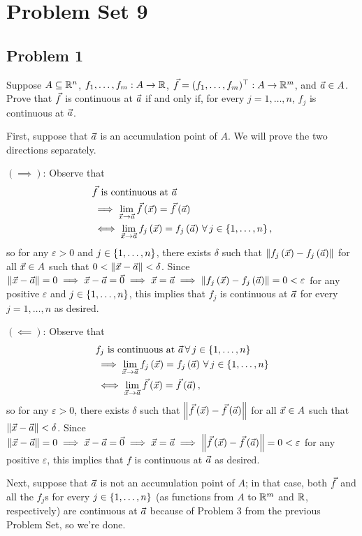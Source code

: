 \documentclass[main.tex]{subfiles}
\begin{document}
\section{Problem Set 9}
\subsection{Problem 1}
\begin{claim}
    Suppose $A \subseteq \mathbb R^n$, $f_1, \ldots ,f_m : A \to \mathbb R$, $\vec{f} = (f_1,\ldots ,f_m)^\top : A \to \mathbb R^m$, and $\vec{a} \in A$. Prove that $\vec{f}$ is continuous at $\vec{a}$ if and only if, for every $j = 1,\ldots ,n$, $f_j$ is continuous at $\vec{a}$.
\end{claim}

\begin{soln}
    First, suppose that $\vec{a}$ is an accumulation point of $A$. We will prove the two directions separately.
    
    $(\implies)$: Observe that
    \begin{align*}
        &\vec{f}\text{ is continuous at }\vec{a} \\
        &\implies \lim_{\vec{x}\to \vec{a}}\vec{f}\left( \vec{x} \right) = \vec{f}\left( \vec{a} \right) \\
        &\iff \lim_{\vec{x}\to \vec{a}}f_j\left( \vec{x} \right) = f_j\left( \vec{a} \right) \,\forall\, j \in \left\{ 1, \ldots , n \right\},
    \end{align*}
    so for any $\varepsilon > 0$ and $j\in \left\{ 1, \ldots , n \right\}$, there exists $\delta$ such that $\left\lVert f_j\left( \vec{x} \right) - f_j\left( \vec{a} \right) \right\rVert$ for all $\vec{x} \in A$ such that $0 < \left\lVert \vec{x} - \vec{a} \right\rVert < \delta$. Since $\left\lVert \vec{x} - \vec{a} \right\rVert = 0\implies \vec{x} - \vec{a} = \vec{0} \implies \vec{x} = \vec{a} \implies \left\lVert f_j\left( \vec{x} \right) - f_j\left( \vec{a} \right) \right\rVert = 0 < \varepsilon$ for any positive $\varepsilon$ and $j\in \left\{ 1, \ldots , n \right\}$, this implies that $f_j$ is continuous at $\vec{a}$ for every $j = 1, \ldots , n$ as desired.

    $(\impliedby)$: Observe that
    \begin{align*}
        &f_j\text{ is continuous at }\vec{a}\,\forall\, j\in \left\{ 1, \ldots , n \right\} \\
        &\implies \lim_{\vec{x}\to \vec{a}}f_j\left( \vec{x} \right) = f_j\left( \vec{a} \right) \,\forall\, j \in \left\{ 1, \ldots , n \right\} \\
        &\iff \lim_{\vec{x}\to \vec{a}}\vec{f}\left( \vec{x} \right) = \vec{f}\left( \vec{a} \right),
    \end{align*}
    so for any $\varepsilon > 0$, there exists $\delta$ such that $\left\lVert \vec{f}\left( \vec{x} \right) - \vec{f}\left( \vec{a} \right) \right\rVert$ for all $\vec{x} \in A$ such that $\left\lVert \vec{x} - \vec{a} \right\rVert < \delta$. Since $\left\lVert \vec{x} - \vec{a} \right\rVert = 0\implies \vec{x} - \vec{a} = \vec{0} \implies \vec{x} = \vec{a} \implies \left\lVert \vec{f}\left( \vec{x} \right) - \vec{f}\left( \vec{a} \right) \right\rVert = 0 < \varepsilon$ for any positive $\varepsilon$, this implies that $f$ is continuous at $\vec{a}$ as desired.

    Next, suppose that $\vec{a}$ is not an accumulation point of $A$; in that case, both $\vec{f}$ and all the $f_j$s for every $j\in \left\{ 1, \ldots , n \right\}$ (as functions from $A$ to $\mathbb R^m$ and $\mathbb R$, respectively) are continuous at $\vec{a}$ because of Problem 3 from the previous Problem Set, so we're done.
\end{soln}
\eject
\end{document}
